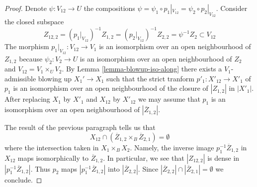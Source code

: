 \begin{proof}
\medskip\noindent
Denote $\psi : V_{12} \to U$ the compositions
$\psi = \psi_1 \circ p_1|_{V_{12}} = \psi_2 \circ p_2|_{V_{12}}$.
Consider the closed subspace
$$
Z_{12, 2} =
(p_1|_{V_{12}})^{-1}Z_{1, 2} =
(p_2|_{V_{12}})^{-1}Z_{2, 2} =
\psi^{-1}Z_2 \subset V_{12}
$$
The morphism $p_1|_{V_{12}} : V_{12} \to V_1$ is an isomorphism
over an open neighbourhood of $Z_{1, 2}$ because $\psi_2 : V_2 \to U$
is an isomorphism over an open neighbourhood of $Z_2$ and
$V_{12} = V_1 \times_U V_2$. By Lemma \ref{lemma-blowup-iso-along}
there exists a $V_1$-admissible blowing up $X_1' \to X_1$
such that the strict tranform $p'_1 : X'_{12} \to X'_1$
of $p_1$ is an isomorphism over an open neighbourhood of
the closure of $|Z_{1, 2}|$ in $|X'_1|$.
After replacing $X_1$ by $X'_1$ and $X_{12}$ by $X'_{12}$
we may assume that $p_1$ is an isomorphism over an open
neighbourhood of $|\overline{Z}_{1, 2}|$.

\medskip\noindent
The result of the previous paragraph tells us that
$$
X_{12} \cap (\overline{Z}_{1, 2} \times_B \overline{Z}_{2, 1}) = \emptyset
$$
where the intersection taken in $X_1 \times_B X_2$. Namely, the inverse
image $p_1^{-1}\overline{Z}_{1, 2}$ in $X_{12}$ maps isomorphically
to $\overline{Z}_{1, 2}$. In particular, we see that $|Z_{12, 2}|$
is dense in $|p_1^{-1}\overline{Z}_{1, 2}|$. Thus $p_2$ maps
$|p_1^{-1}\overline{Z}_{1, 2}|$ into $|\overline{Z}_{2, 2}|$.
Since $|\overline{Z}_{2, 2}| \cap |\overline{Z}_{2, 1}| = \emptyset$
we conclude.


\end{proof}
